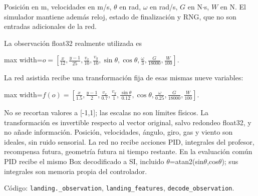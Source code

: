 \documentclass[12pt,a4paper]{article}
\begin{document}
Posición en m,\allowbreak{} velocidades en m/\allowbreak{}s,\allowbreak{} \ensuremath{\theta} en rad,\allowbreak{} \ensuremath{\omega} en rad/\allowbreak{}s,\allowbreak{} $G$ en N\ensuremath{\cdot}s,\allowbreak{} $W$ en N. El simulador mantiene además reloj,\allowbreak{} estado de finalización y RNG,\allowbreak{} que no son entradas adicionales de la red.


La observación float32 realmente utilizada es



\begin{center}\begin{adjustbox}{max width=\linewidth}$\displaystyle o=\left[\frac{x}{12},\frac{y-1}{25},\frac{v_x}{10},\frac{v_y}{10},
\sin\theta,\cos\theta,\frac{\omega}{3},\frac{G}{18000},\frac{W}{100}\right].$\end{adjustbox}\end{center}



La red asistida recibe una transformación fija de esas mismas nueve variables:



\begin{center}\begin{adjustbox}{max width=\linewidth}$\displaystyle f(o)=\left[\frac{x}{1.5},\frac{y-1}{2},\frac{v_x}{0.7},\frac{v_y}{1},
\frac{\sin\theta}{0.12},\cos\theta,\frac{\omega}{0.25},\frac{G}{18000},\frac{W}{100}\right].$\end{adjustbox}\end{center}



No se recortan valores a [-1,\allowbreak{}1]; las escalas no son límites físicos. La transformación es invertible respecto al vector original,\allowbreak{} salvo redondeo float32,\allowbreak{} y no añade información. Posición,\allowbreak{} velocidades,\allowbreak{} ángulo,\allowbreak{} giro,\allowbreak{} gas y viento son ideales,\allowbreak{} sin ruido sensorial. La red no recibe acciones PID,\allowbreak{} integrales del profesor,\allowbreak{} recompensa futura,\allowbreak{} geometría futura ni tiempo restante. En la evaluación común PID recibe el mismo Box decodificado a SI,\allowbreak{} incluido \ensuremath{\theta}=atan2(sin\ensuremath{\theta},\allowbreak{}cos\ensuremath{\theta}); sus integrales son memoria propia del controlador.


Código: \textcolor{Accent}{\nolinkurl{landing._observation}},\allowbreak{} \textcolor{Accent}{\nolinkurl{landing_features}},\allowbreak{} \textcolor{Accent}{\nolinkurl{decode_observation}}.
\end{document}
